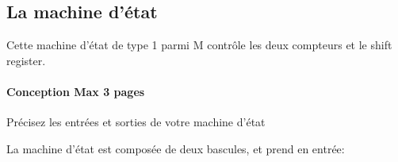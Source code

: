 \documentclass[a4paper]{article} %
\begin{document}
\subsection{La machine d’état}
Cette machine d’état de type 1 parmi M contrôle les deux compteurs et le shift register. 
\begin{tcolorbox}[colframe=Monokaimagenta,colback=white]
\paragraph{Conception Max 3 pages}

Précisez les entrées et sorties de votre machine d’état

La machine d'état est composée de deux bascules, et prend en entrée:
\begin{itemize}


\end{itemize}
\end{tcolorbox}
\end{document}
